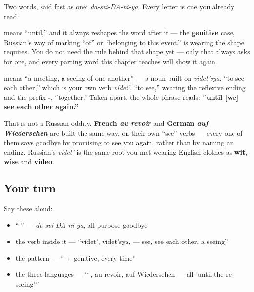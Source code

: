 Two words, said fast as one: \emph{da-svi-DA-ni-ya}. Every letter is one you already read.

\begin{grammarlens}[title={Grammar Lens: \ru{до} asks for the genitive}]
\textbf{} means \textquotedblleft{}until,\textquotedblright{} and it always reshapes the word after it — the \textbf{genitive} case, Russian's way of marking \textquotedblleft{}of\textquotedblright{} or \textquotedblleft{}belonging to this event.\textquotedblright{} \emph{} is \emph{} wearing the shape \emph{} requires. You do not need the rule behind that shape yet — only that \emph{} always asks for one, and every parting word this chapter teaches will show it again.
\end{grammarlens}

\begin{cousinweb}
\textbf{} means \textquotedblleft{}a meeting, a seeing of one another\textquotedblright{} — a noun built on \emph{videt'sya}, \textquotedblleft{}to see each other,\textquotedblright{} which is your own verb \emph{vídet'}, \textquotedblleft{}to see,\textquotedblright{} wearing the reflexive ending and the prefix \textbf{-}, \textquotedblleft{}together.\textquotedblright{} Taken apart, the whole phrase reads: \textbf{\textquotedblleft{}until {[}we{]} see each other again.\textquotedblright{}}

That is not a Russian oddity. \textbf{French \emph{au revoir}} and \textbf{German \emph{auf Wiedersehen}} are built the same way, on their own \textquotedblleft{}see\textquotedblright{} verbs — every one of them says goodbye by promising to see you again, rather than by naming an ending. Russian's \emph{vídet'} is the same root you met wearing English clothes as \textbf{wit}, \textbf{wise} and \textbf{video}.
\end{cousinweb}

\subsection*{Your turn}
Say these aloud:

\begin{itemize}
\raggedright
  \item \textquotedblleft{} \textquotedblright{} — \emph{da-svi-DA-ni-ya}, all-purpose goodbye
  \item the verb inside it — \textquotedblleft{}vídet', videt'sya,  — see, see each other, a seeing\textquotedblright{}
  \item the pattern — \textquotedblleft{} + genitive, every time\textquotedblright{}
  \item the three languages — \textquotedblleft{} , au revoir, auf Wiedersehen — all 'until the re-seeing'\textquotedblright{}
\end{itemize}

